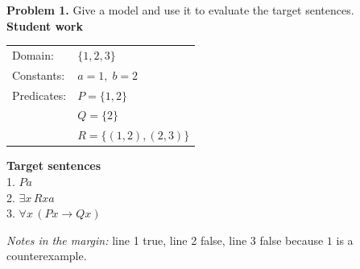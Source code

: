 \documentclass[11pt]{article}
\begin{document}
\noindent\textbf{Problem 1.} Give a model and use it to evaluate the target sentences.\\[0.75em]

\noindent\textbf{Student work}\\[0.4em]
\begin{tabular}{@{}ll@{}}
Domain: & $\{1,2,3\}$ \\
Constants: & $a = 1,\; b = 2$ \\
Predicates: & $P = \{1,2\}$ \\
 & $Q = \{2\}$ \\
 & $R = \{(1,2),(2,3)\}$
\end{tabular}

\vspace{1.2em}
\noindent\textbf{Target sentences}\\[0.4em]
1. $Pa$\\
2. $\exists x\,Rxa$\\
3. $\forall x\,(Px \to Qx)$

\vspace{1.2em}
\noindent\textit{Notes in the margin:} line 1 true, line 2 false, line 3 false because $1$ is a counterexample.
\end{document}
